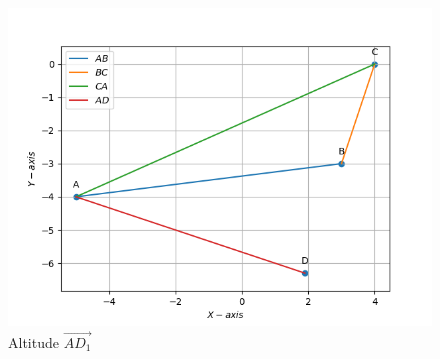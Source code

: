 \documentclass[10pt]{book}
\begin{document}
\begin{enumerate}[label=\thesection.\arabic*.,ref=\thesection.\theenumi]
\begin{figure}[H]
\includegraphics[width=\columnwidth]{figs/AD1_altitude.png}
\caption{Altitude $\vec{AD_1}$}
\label{fig:Altitude_AD1}
\end{figure}


\end{enumerate}
\end{document}

